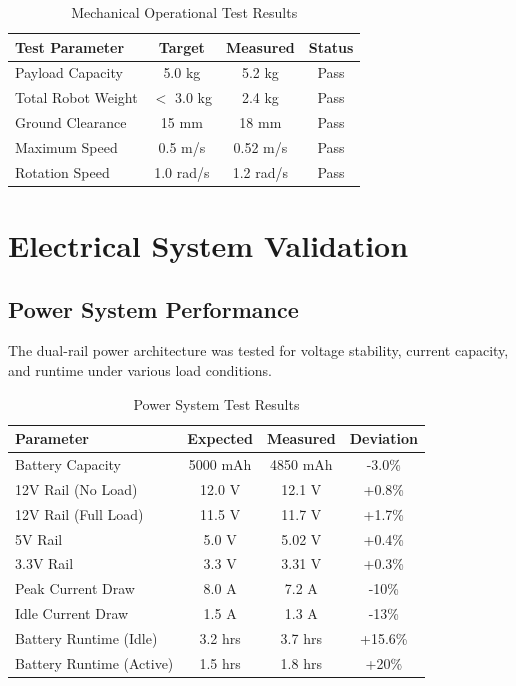 \begin{table}[H]
\centering
\caption{Mechanical Operational Test Results}
\label{tab:mech_operational}
\begin{tabular}{|l|c|c|c|}
\hline
\textbf{Test Parameter} & \textbf{Target} & \textbf{Measured} & \textbf{Status} \\
\hline
Payload Capacity & 5.0 kg & 5.2 kg & Pass \\
Total Robot Weight & $<$ 3.0 kg & 2.4 kg & Pass \\
Ground Clearance & 15 mm & 18 mm & Pass \\
Maximum Speed & 0.5 m/s & 0.52 m/s & Pass \\
Rotation Speed & 1.0 rad/s & 1.2 rad/s & Pass \\
\hline
\end{tabular}
\end{table}

\section{Electrical System Validation}
\label{sec:electrical_testing}

\subsection{Power System Performance}

The dual-rail power architecture was tested for voltage stability, current capacity, and runtime under various load conditions.

\begin{table}[H]
\centering
\caption{Power System Test Results}
\label{tab:power_test_results}
\begin{tabular}{|l|c|c|c|}
\hline
\textbf{Parameter} & \textbf{Expected} & \textbf{Measured} & \textbf{Deviation} \\
\hline
Battery Capacity & 5000 mAh & 4850 mAh & -3.0\% \\
12V Rail (No Load) & 12.0 V & 12.1 V & +0.8\% \\
12V Rail (Full Load) & 11.5 V & 11.7 V & +1.7\% \\
5V Rail & 5.0 V & 5.02 V & +0.4\% \\
3.3V Rail & 3.3 V & 3.31 V & +0.3\% \\
Peak Current Draw & 8.0 A & 7.2 A & -10\% \\
Idle Current Draw & 1.5 A & 1.3 A & -13\% \\
Battery Runtime (Idle) & 3.2 hrs & 3.7 hrs & +15.6\% \\
Battery Runtime (Active) & 1.5 hrs & 1.8 hrs & +20\% \\
\hline
\end{tabular}
\end{table}

